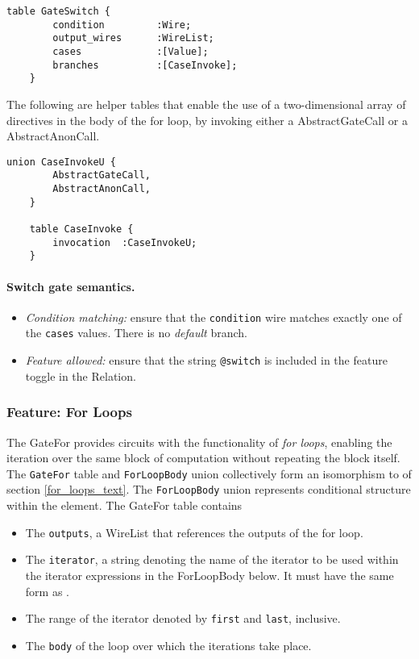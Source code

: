 \begin{lstlisting}[style=fbslisting]   
    table GateSwitch {
        condition         :Wire;
        output_wires      :WireList;
        cases             :[Value];
        branches          :[CaseInvoke];
    }
\end{lstlisting}

The following are helper tables that enable the use of a two-dimensional array of directives in the body of the for loop, by invoking either a \textsf{AbstractGateCall} or a \textsf{AbstractAnonCall}.

\begin{lstlisting}[style=fbslisting]
    union CaseInvokeU {
        AbstractGateCall,
        AbstractAnonCall,
    }
    
    table CaseInvoke {
        invocation  :CaseInvokeU;
    }
\end{lstlisting}

\paragraph{Switch gate semantics.}
\begin{itemize}
    \item \textit{Condition matching:} ensure that the \texttt{condition} wire matches exactly one of the \texttt{cases} values. There is no \emph{default} branch.
    \item \textit{Feature allowed:} ensure that the string \texttt{@switch} is included in the feature toggle in the \textsf{Relation}.
\end{itemize}


\subsubsection{Feature: For Loops}\label{sec:for-loops}

The \textsf{GateFor} provides circuits with the functionality of \emph{for loops}, enabling the iteration over the same block of computation without repeating the block itself. The \texttt{GateFor} table and \texttt{ForLoopBody} union collectively form an isomorphism to  of section \ref{for_loops_text}.
The \texttt{ForLoopBody} union represents conditional structure within the  element. The \textsf{GateFor} table contains

\begin{itemize}
    \item The \texttt{outputs}, a \textsf{WireList} that references the outputs of the for loop.
    \item The \texttt{iterator}, a string denoting the name of the iterator to be used within the iterator expressions in the \textsf{ForLoopBody} below. It must have the same form as .
    \item The range of the iterator denoted by \texttt{first} and \texttt{last}, inclusive.
    \item The \texttt{body} of the loop over which the iterations take place.
\end{itemize}


